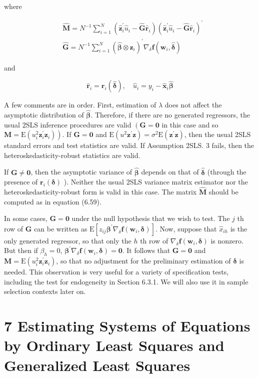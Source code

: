 \documentclass[10pt]{article}
\begin{document}
where


\begin{align*}
& \hat{\mathbf{M}}=N^{-1} \sum_{i=1}^{N}\left(\hat{\mathbf{z}}_{i}^{\prime} \hat{u}_{i}-\hat{\mathbf{G}} \hat{\mathbf{r}}_{i}\right)\left(\hat{\mathbf{z}}_{i}^{\prime} \hat{u}_{i}-\hat{\mathbf{G}} \hat{\mathbf{r}}_{i}\right)^{\prime}  \tag{6.59}\\
& \hat{\mathbf{G}}=N^{-1} \sum_{i=1}^{N}\left(\hat{\boldsymbol{\beta}} \otimes \hat{\mathbf{z}}_{i}\right)^{\prime} \nabla_{\delta} \mathbf{f}\left(\mathbf{w}_{i}, \hat{\boldsymbol{\delta}}\right) \tag{6.60}
\end{align*}


and


\begin{equation*}
\hat{\mathbf{r}}_{i}=\mathbf{r}_{i}(\hat{\boldsymbol{\delta}}), \quad \hat{u}_{i}=y_{i}-\hat{\mathbf{x}}_{i} \hat{\boldsymbol{\beta}} \tag{6.61}
\end{equation*}


A few comments are in order. First, estimation of $\lambda$ does not affect the asymptotic distribution of $\hat{\boldsymbol{\beta}}$. Therefore, if there are no generated regressors, the usual 2SLS inference procedures are valid $\left(\mathbf{G}=\mathbf{0}\right.$ in this case and so $\left.\mathbf{M}=\mathrm{E}\left(u_{i}^{2} \mathbf{z}_{i}^{\prime} \mathbf{z}_{i}\right)\right)$. If $\mathbf{G}=\mathbf{0}$ and $\mathrm{E}\left(u^{2} \mathbf{z}^{\prime} \mathbf{z}\right)=\sigma^{2} \mathrm{E}\left(\mathbf{z}^{\prime} \mathbf{z}\right)$, then the usual 2SLS standard errors and test statistics are valid. If Assumption 2SLS. 3 fails, then the heteroskedasticity-robust statistics are valid.

If $\mathbf{G} \neq \mathbf{0}$, then the asymptotic variance of $\hat{\boldsymbol{\beta}}$ depends on that of $\hat{\boldsymbol{\delta}}$ (through the presence of $\mathbf{r}_{i}(\boldsymbol{\delta})$ ). Neither the usual 2SLS variance matrix estimator nor the heteroskedasticity-robust form is valid in this case. The matrix $\hat{\mathbf{M}}$ should be computed as in equation (6.59).

In some cases, $\mathbf{G}=\mathbf{0}$ under the null hypothesis that we wish to test. The $j$ th row of $\mathbf{G}$ can be written as $\mathrm{E}\left[z_{i j} \boldsymbol{\beta}^{\prime} \nabla_{\delta} \mathbf{f}\left(\mathbf{w}_{i}, \boldsymbol{\delta}\right)\right]$. Now, suppose that $\hat{x}_{i h}$ is the only generated regressor, so that only the $h$ th row of $\nabla_{\delta} \mathbf{f}\left(\mathbf{w}_{i}, \boldsymbol{\delta}\right)$ is nonzero. But then if $\beta_{h}=0$, $\boldsymbol{\beta}^{\prime} \nabla_{\delta} \mathbf{f}\left(\mathbf{w}_{i}, \boldsymbol{\delta}\right)=\mathbf{0}$. It follows that $\mathbf{G}=\mathbf{0}$ and $\mathbf{M}=\mathrm{E}\left(u_{i}^{2} \mathbf{z}_{i}^{\prime} \mathbf{z}_{i}\right)$, so that no adjustment for the preliminary estimation of $\boldsymbol{\delta}$ is needed. This observation is very useful for a variety of specification tests, including the test for endogeneity in Section 6.3.1. We will also use it in sample selection contexts later on.

\section*{7 Estimating Systems of Equations by Ordinary Least Squares and Generalized Least Squares}
\end{document}

